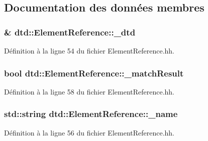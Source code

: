 \subsection{Documentation des données membres}
\hypertarget{classdtd_1_1_element_reference_a1aa135e9320d9117a70401d299ad04cb}{
\subsubsection[{\_\-dtd}]{\& {\bf dtd::ElementReference::\_\-dtd}}}
\label{classdtd_1_1_element_reference_a1aa135e9320d9117a70401d299ad04cb}


Définition à la ligne 54 du fichier ElementReference.hh.

\hypertarget{classdtd_1_1_element_reference_ac8eea1ec6ad68e911179025d5471929b}{
\subsubsection[{\_\-matchResult}]{\setlength{\rightskip}{0pt plus 5cm}bool {\bf dtd::ElementReference::\_\-matchResult}}}
\label{classdtd_1_1_element_reference_ac8eea1ec6ad68e911179025d5471929b}


Définition à la ligne 58 du fichier ElementReference.hh.

\hypertarget{classdtd_1_1_element_reference_a3644697416e87370eedfa296d1c976ac}{
\subsubsection[{\_\-name}]{\setlength{\rightskip}{0pt plus 5cm}std::string {\bf dtd::ElementReference::\_\-name}}}
\label{classdtd_1_1_element_reference_a3644697416e87370eedfa296d1c976ac}


Définition à la ligne 56 du fichier ElementReference.hh.

